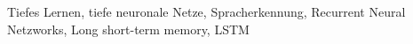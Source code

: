 \documentclass[conference]{IEEEtran}
\begin{document}
	\begin{IEEEkeywords}
		Tiefes Lernen, tiefe neuronale Netze, Spracherkennung, Recurrent Neural Netzworks, Long short-term memory, LSTM 
	\end{IEEEkeywords}
	

	
	
	
	
	
	
	
	
	
	
	
\end{document}
